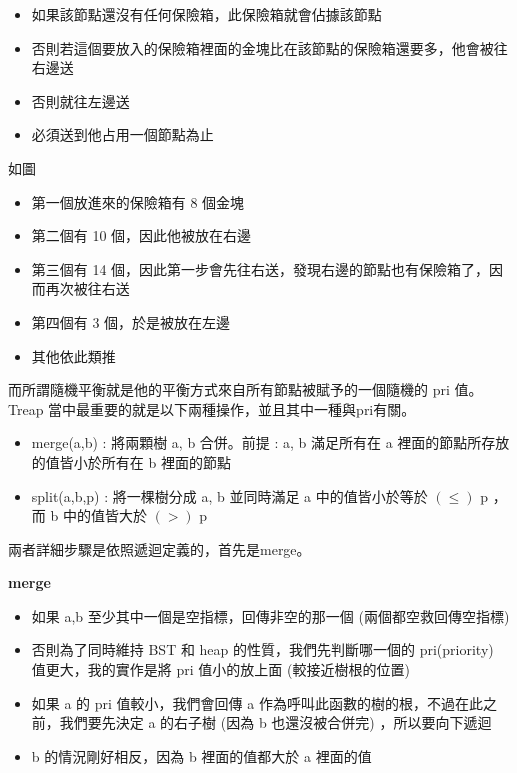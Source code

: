     \begin{itemize}
        \item 如果該節點還沒有任何保險箱，此保險箱就會佔據該節點
        \item 否則若這個要放入的保險箱裡面的金塊比在該節點的保險箱還要多，他會被往右邊送
        \item 否則就往左邊送
        \item 必須送到他占用一個節點為止
    \end{itemize}

    如圖

    \begin{itemize}
        \item 第一個放進來的保險箱有 8 個金塊
        \item 第二個有 10 個，因此他被放在右邊
        \item 第三個有 14 個，因此第一步會先往右送，發現右邊的節點也有保險箱了，因而再次被往右送
        \item 第四個有 3 個，於是被放在左邊
        \item 其他依此類推
    \end{itemize}

    而所謂隨機平衡就是他的平衡方式來自所有節點被賦予的一個隨機的 pri 值。
    Treap 當中最重要的就是以下兩種操作，並且其中一種與pri有關。

    \begin{itemize}
        \item merge(a,b) : 將兩顆樹 a, b 合併。前提 : a, b 滿足所有在 a 裡面的節點所存放的值皆小於所有在 b 裡面的節點
        \item split(a,b,p) : 將一棵樹分成 a, b 並同時滿足 a 中的值皆小於等於 $(\le)$ p ， 而 b 中的值皆大於 $(>)$ p
    \end{itemize}

    兩者詳細步驟是依照遞迴定義的，首先是merge。

    \textbf{merge}

    \begin{itemize}
        \item 如果 a,b 至少其中一個是空指標，回傳非空的那一個 (兩個都空救回傳空指標)
        \item 否則為了同時維持 BST 和 heap 的性質，我們先判斷哪一個的 pri(priority) 值更大，我的實作是將 pri 值小的放上面 (較接近樹根的位置)
        \item 如果 a 的 pri 值較小，我們會回傳 a 作為呼叫此函數的樹的根，不過在此之前，我們要先決定 a 的右子樹 (因為 b 也還沒被合併完) ，所以要向下遞迴
        \item b 的情況剛好相反，因為 b 裡面的值都大於 a 裡面的值
    \end{itemize}

